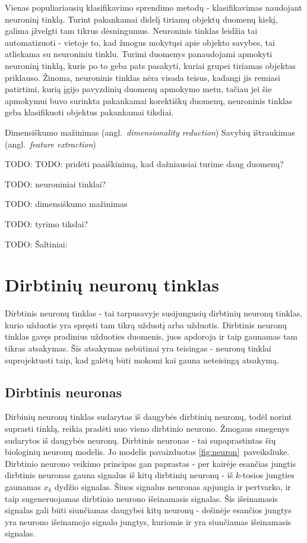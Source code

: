 \documentclass{VUMIFPSbakalaurinis}
\newcommand{\TODO}[1]{
\colorbox{todo-background-color}{TODO: #1}
}
\begin{document}
Vienas populiariausių klasifikavimo sprendimo metodų - klasifikavimas naudojant neuroninį tinklą.
Turint pakankamai didelį tiriamų objektų duomenų kiekį, galima įžvelgti tam tikrus dėsningumus.
Neuroninis tinklas leidžia tai automatizuoti - vietoje to, kad žmogus mokytųsi apie objekto savybes, tai atliekama su neuroniniu tinklu.
Turimi duomenys panaudojami apmokyti neuroninį tinklą, kuris po to geba pats pasakyti, kuriai grupei tiriamas objektas priklauso.
Žinoma, neuroninis tinklas nėra visada teisus, kadangi jis remiasi patirtimi, kurią įgijo pavyzdinių duomenų apmokymo metu, tačiau jei šie apmokymui buvo surinkta pakankamai korektiškų duomenų, neuroninis tinklas geba klasifikuoti objektus pakankamai tiksliai.

Dimensiškumo mažinimas (angl.~\textit{dimensionality reduction})
Savybių ištraukimas (angl.~\textit{feature extraction})

\TODO{TODO: pridėti paaiškinimą, kad dažniausiai turime daug duomenų?}

\TODO{neuroniniai tinklai?}
\TODO{dimensiškumo mažinimas}
\TODO{tyrimo tikslai?}


\TODO{Šaltiniai:}

\cite{298007} \cite{857823} \cite{857823} \cite{1007668} \cite{363467}

\section{Dirbtinių neuronų tinklas}

Dirbtinis neuronų tinklas - tai tarpusavyje susijungusių dirbtinių neuronų tinklas, kurio užduotis yra spręsti tam tikrą užduotį arba užduotis.
Dirbtinis neuronų tinklas gavęs pradinius užduoties duomenis, juos apdoroja ir taip gaunamas tam tikras atsakymas.
Šis atsakymas nebūtinai yra teisingas - neuronų tinklai suprojektuoti taip, kad galėtų būti mokomi kai gauna neteisingą atsakymą.

\subsection{Dirbtinis neuronas}

Dirbinių neuronų tinklas sudarytas iš daugybės dirbtinių neuronų, todėl norint suprasti tinklą, reikia pradėti nuo vieno dirbtinio neurono.
Žmogaus smegenys sudarytos iš daugybės neuronų.
Dirbtinis neuronas - tai supaprastintas šių biologinių neuronų modelis.
Jo modelis pavaizduotas \ref{fig:neuron}~paveiksliuke.
Dirbtinio neurono veikimo principas gan paprastas - per kairėje esančias jungtis dirbtinis neuronas gauna signalus iš kitų dirbtinių neuronų - iš $k$-tosios jungties gaunamas $x_k$ dydžio signalas.
Šiuos signalus neuronas apjungia ir pertvarko, ir taip sugeneruojamas dirbtinio neurono išeinamasis signalas.
Šis išeinamasis signalas gali būti siunčiamas daugybei kitų neuronų - dešinėje esančios jungtys yra neurono išeinamojo signalo jungtys, kuriomis ir yra siunčiamas išeinamasis signalas.
\end{document}
